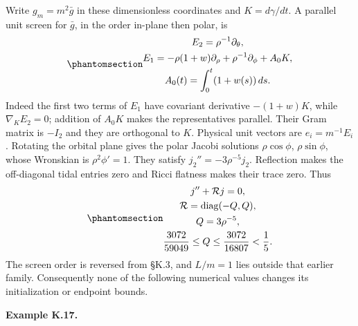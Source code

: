 \documentclass[
  english,
  11pt,
  reqno]{amsart}
\makeatletter
\newcounter{none} %
\newcommand{\pandocstatementheading}[1]{%
  \par\addpenalty{\@beginparpenalty}%
  \addvspace{.5\baselineskip plus .2\baselineskip minus .2\baselineskip}%
  {\normalfont\bfseries #1\par}%
  \nobreak\@afterindenttrue\@afterheading
}
\makeatother
\begin{document}
Write \(g_m=m^2\bar g\) in these dimensionless coordinates and
\(K=d\gamma/dt\). A parallel unit screen for \(\bar g\), in the order
in-plane then polar, is
\begin{equation}\protect\phantomsection\label{eq:sch-r1-central-screen}{\begin{gathered}
E_2=\rho^{-1}\partial_\theta, \\
E_1=-\rho(1+w)\partial_\rho+\rho^{-1}\partial_\phi+A_0K, \\
A_0(t)=\int_0^t(1+w(s))\,ds.
\end{gathered}}\end{equation} Indeed the first two terms of \(E_1\) have covariant
derivative \(-(1+w)K\), while \(\nabla_KE_2=0\); addition of \(A_0K\)
makes the representatives parallel. Their Gram matrix is \(-I_2\) and
they are orthogonal to \(K\). Physical unit vectors are
\(e_i=m^{-1}E_i\). Rotating the orbital plane gives the polar Jacobi
solutions \(\rho\cos\phi\), \(\rho\sin\phi\), whose Wronskian is
\(\rho^2\phi'=1\). They satisfy \(j_2''=-3\rho^{-5}j_2\). Reflection
makes the off-diagonal tidal entries zero and Ricci flatness makes their
trace zero. Thus
\begin{equation}\protect\phantomsection\label{eq:sch-r1-central-tide}{\begin{gathered}
j''+\mathcal Rj=0, \\
\mathcal R=\operatorname{diag}(-Q,Q), \\
Q=3\rho^{-5}, \\
\frac{3072}{59049}\le Q\le\frac{3072}{16807}<\frac15.
\end{gathered}}\end{equation} The screen order is reversed from §K.3, and \(L/m=1\)
lies outside that earlier family. Consequently none of the following
numerical values changes its initialization or endpoint bounds.

\pandocstatementheading{\protect{}\label{ex:sch-r1-rational-observable}Example K.17.}
\end{document}
